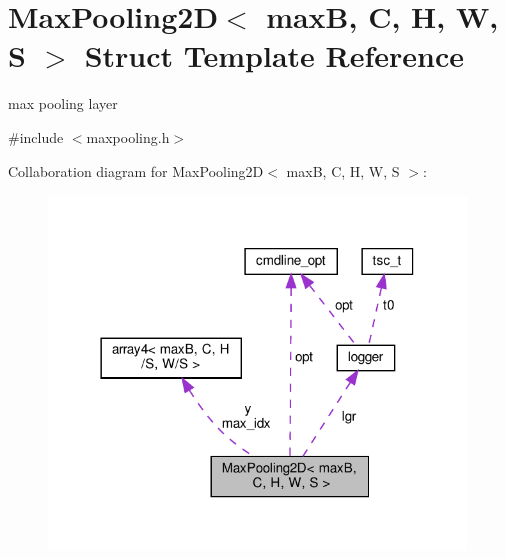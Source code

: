 \hypertarget{structMaxPooling2D}{}\section{Max\+Pooling2D$<$ maxB, C, H, W, S $>$ Struct Template Reference}
\label{structMaxPooling2D}


max pooling layer  




{\ttfamily \#include $<$maxpooling.\+h$>$}



Collaboration diagram for Max\+Pooling2D$<$ maxB, C, H, W, S $>$\+:\nopagebreak
\begin{figure}[H]
\begin{center}
\leavevmode
\includegraphics[width=314pt]{structMaxPooling2D__coll__graph}
\end{center}
\end{figure}
